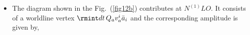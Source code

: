 \begin{itemize}
\item The diagram shown in the Fig.~(\ref{fig12b}) contributes at $N^{(1)}LO.$ It consists of a worldline vertex $\rmint dt\,Q_av_a^{i}\Bar{a}_{i}$ and the corresponding amplitude is given by,
\begin{align}

\end{align}
\end{itemize}
